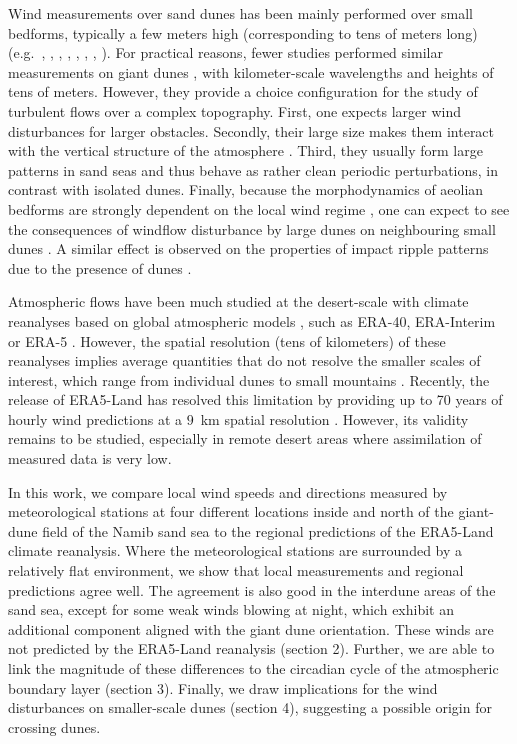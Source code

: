 Wind measurements over sand dunes has been mainly performed over small bedforms, typically a few meters high (corresponding to tens of meters long) (e.g.~\citet{Mulligan1988}, \citet{Hesp1989}, \citet{Lancaster1996}, \citet{MckennaNeuman1997}, \citet{Sauermann2003}, \citet{Andreotti2002}, \citet{Walker2002}, \citet{Weaver2011}). For practical reasons, fewer studies performed similar measurements on giant dunes \citep{Havholm1988}, with kilometer-scale wavelengths and heights of tens of meters. However, they provide a choice configuration for the study of turbulent flows over a complex topography. First, one expects larger wind disturbances for larger obstacles. Secondly, their large size makes them interact with the vertical structure of the atmosphere \citep{Andreotti2009}. Third, they usually form large patterns in sand seas and thus behave as rather clean periodic perturbations, in contrast with isolated dunes. Finally, because the morphodynamics of aeolian bedforms are strongly dependent on the local wind regime \citep{Livingstone2019}, one can expect to see the consequences of windflow disturbance by large dunes on neighbouring small dunes \citep{Brookfield1977, Ewing2006}. A similar effect is observed on the properties of impact ripple patterns due to the presence of dunes \citep{Howard1977, Hood2021}.

Atmospheric flows have been much studied at the desert-scale with climate reanalyses based on global atmospheric models \citep{Blumberg1996, Livingstone2010, Ashkenazy2012, Jolivet2021, Hu2021}, such as ERA-40, ERA-Interim or ERA-5 \citep{Uppala2005, Dee2011, Hersbach2020}. However, the spatial resolution (tens of kilometers) of these reanalyses implies average quantities that do not resolve the smaller scales of interest, which range from individual dunes to small mountains \citep{Livingstone2010}. Recently, the release of ERA5-Land has resolved this limitation by providing up to 70 years of hourly wind predictions at a $9$~km spatial resolution \citep{munoz2021}. However, its validity remains to be studied, especially in remote desert areas where assimilation of measured data is very low.

In this work, we compare local wind speeds and directions measured by meteorological stations at four different locations inside and north of the giant-dune field of the Namib sand sea to the regional predictions of the ERA5-Land climate reanalysis. Where the meteorological stations are surrounded by a relatively flat environment, we show that local measurements and regional predictions agree well. The agreement is also good in the interdune areas of the sand sea, except for some weak winds blowing at night, which exhibit an additional component aligned with the giant dune orientation. These winds are not predicted by the ERA5-Land reanalysis (section 2). Further, we are able to link the magnitude of these differences to the circadian cycle of the atmospheric boundary layer (section 3). Finally, we draw implications for the wind disturbances on smaller-scale dunes (section 4), suggesting a possible origin for crossing dunes.


